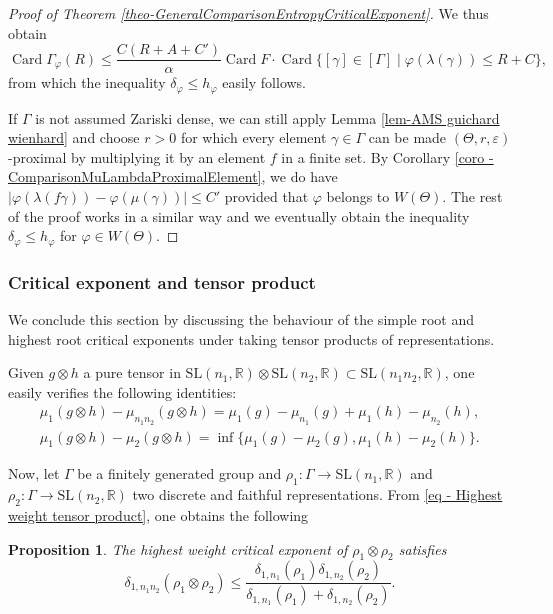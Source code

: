 \documentclass[JEP,XML,SOM,Unicode,NoEqCountersInSection,NoFloatCountersInSection,published]{cedram}
\newtheorem{prop}[theo]{Proposition}
\theoremstyle{definition}
\newcommand{\R}{\mathbb{R}}
\newcommand{\SL}{\mathrm{SL}}
\DeclareMathOperator{\Card}{Card}
\let\epsilon\varepsilon
\let\phi\varphi
\let\G\Gamma
\let\g\gamma
\begin{document}
\begin{proof}[Proof of Theorem \ref{theo-GeneralComparisonEntropyCriticalExponent}]
We thus obtain
\[\Card \Gamma_\phi(R) \leq \frac{C(R+A+C')}{\alpha} \Card F \cdot \Card \{[\g]\in [\Gamma] \mid \varphi(\lambda(\g))\leq R+C\},\]
from which the inequality $\delta_\varphi \leq h_\varphi$ easily follows.

If $\Gamma$ is not assumed Zariski dense, we can still apply Lemma \ref{lem-AMS guichard wienhard} and choose $r>0$ for which every element $\g\in \G$ can be made $(\Theta,r,\epsilon)$-proximal by multiplying it by an element $f$ in a finite set. By Corollary \ref{coro - ComparisonMuLambdaProximalElement}, we do have $|\phi(\lambda(f \g)) - \phi(\mu(\g))| \leq C'$ provided that $\phi$ belongs to $W(\Theta)$. The rest of the proof works in a similar way and we eventually obtain the inequality $\delta_\phi \leq h_\phi$ for $\phi \in W(\Theta)$.
\end{proof}

\subsubsection{Critical exponent and tensor product}

We conclude this section by discussing the behaviour of the simple root and highest root critical exponents under taking tensor products of representations.

Given $g\otimes h$ a pure tensor in $\SL(n_1,\R)\otimes \SL(n_2,\R) \subset \SL(n_1n_2,\R)$, one easily verifies the following identities:
\begin{gather} \label{eq - Highest weight tensor product}
\mu_1(g\otimes h) - \mu_{n_1n_2}(g\otimes h) = \mu_1(g) - \mu_{n_1}(g) + \mu_1(h) - \mu_{n_2}(h),\\
\label{eq - Simple weight tensor product}
\mu_1(g\otimes h) - \mu_{2}(g\otimes h) = \inf \{\mu_1(g) - \mu_2(g), \mu_1(h) - \mu_{2}(h)\}.\end{gather}

Now, let $\Gamma$ be a finitely generated group and $\rho_1: \Gamma \to \SL(n_1,\R)$ and $\rho_2: \Gamma \to \SL(n_2,\R)$ two discrete and faithful representations. From \eqref{eq - Highest weight tensor product}, one obtains the following

\begin{prop} \label{prop - Critical exp HW tensor product}
The highest weight critical exponent of $\rho_1\otimes \rho_2$ satisfies
\[\delta_{1,n_1n_2}(\rho_1\otimes \rho_2)\leq \frac{\delta_{1,n_1}(\rho_1) \delta_{1,n_2}(\rho_2)}{\delta_{1,n_1}(\rho_1) +\delta_{1,n_2}(\rho_2)}.\]
\end{prop}
\end{document}
